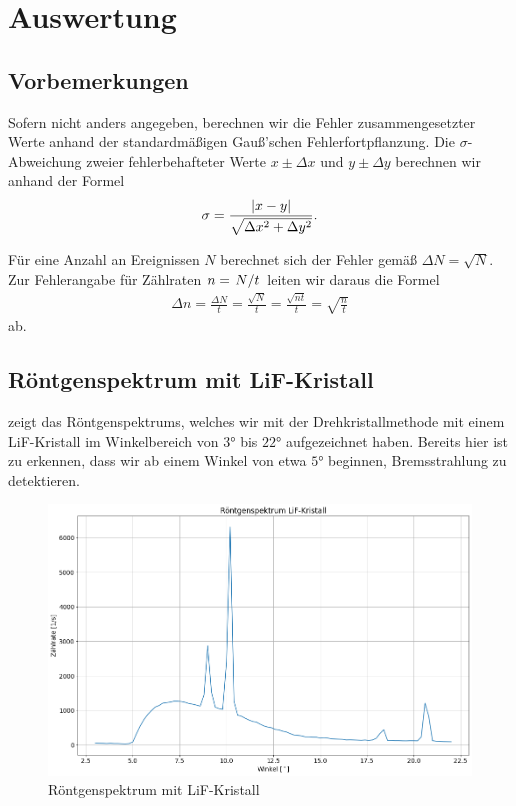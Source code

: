 \section{Auswertung}

\subsection*{Vorbemerkungen}

Sofern nicht anders angegeben, berechnen wir die Fehler zusammengesetzter Werte anhand der standardmäßigen Gauß'schen Fehlerfortpflanzung. Die $\sigma$-Abweichung zweier fehlerbehafteter Werte $x \pm \Delta x$ und $y \pm \Delta y$ berechnen wir anhand der Formel
\begin{align}
  \sigma = \frac{\qty|x - y|}{\sqrt{\Delta x^2 + \Delta y^2}}.
\end{align}

Für eine Anzahl an Ereignissen $N$ berechnet sich der Fehler gemäß $\Delta N = \sqrt{N}$. Zur Fehlerangabe für Zählraten $n = \flatfrac{N}{t}$ leiten wir daraus die Formel
\begin{align}
  \Delta n = \frac{\Delta N}{t}= \frac{\sqrt{N}}{t} = \frac{\sqrt{nt}}{t} = \sqrt{\frac{n}{t}}
\end{align}
ab.

\subsection{Röntgenspektrum mit LiF-Kristall}

 zeigt das Röntgenspektrums, welches wir mit der Drehkristallmethode mit einem LiF-Kristall im Winkelbereich von $3\si{\degree}$ bis $22\si{\degree}$ aufgezeichnet haben. Bereits hier ist zu erkennen, dass wir ab einem Winkel von etwa $5\si{\degree}$ beginnen, Bremsstrahlung zu detektieren.

\begin{figure}[H]
  \centering
  \includegraphics[width=.9\textwidth]{files/plots/spektrum_lif_komplett.png}
  \caption{Röntgenspektrum mit LiF-Kristall}
  \label{fig:spektrum_lif_komplett}
\end{figure}

